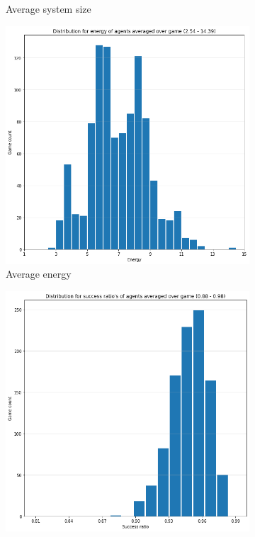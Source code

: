 \begin{figure}[ht]
\begin{subfigure}{.30\textwidth}
        \captionsetup{width=0.9\linewidth}
        \captionsetup{justification=centering}
        \caption{Average system size}
    \end{subfigure}
    \hspace{0.5cm}
    \begin{subfigure}{.30\textwidth}
        \centering
        \includegraphics[width=\textwidth]{images/results/original_energy.png}
        \captionsetup{width=0.9\linewidth}
        \captionsetup{justification=centering}
        \caption{Average energy}
    \end{subfigure}
    \begin{subfigure}{.30\textwidth}
        \centering
        \includegraphics[width=\textwidth]{images/results/bark_sucess.png}

\end{subfigure}
\end{figure}
